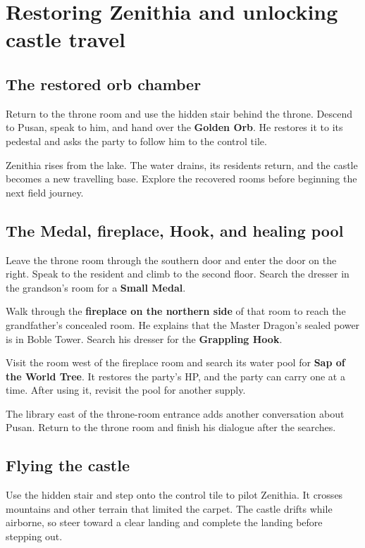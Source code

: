 \section{Restoring Zenithia and unlocking castle travel}

\subsection*{The restored orb chamber}

Return to the throne room and use the hidden stair behind the
throne. Descend to Pusan, speak to him, and hand over the
\textbf{Golden Orb}. He restores it to its pedestal and
asks the party to follow him to the control tile.

Zenithia rises from the lake. The water drains, its residents
return, and the castle becomes a new travelling base. Explore
the recovered rooms before beginning the next field journey.

\subsection*{The Medal, fireplace, Hook, and healing pool}

Leave the throne room through the southern door and enter
the door on the right. Speak to the resident and climb to
the second floor. Search the dresser in the grandson's room
for a \textbf{Small Medal}.

Walk through the \textbf{fireplace on the northern side}
of that room to reach the grandfather's concealed room.
He explains that the Master Dragon's sealed power is in
Boble Tower. Search his dresser for the \textbf{Grappling Hook}.

Visit the room west of the fireplace room and search its
water pool for \textbf{Sap of the World Tree}. It restores
the party's HP, and the party can carry one at a time.
After using it, revisit the pool for another supply.

The library east of the throne-room entrance adds another
conversation about Pusan. Return to the throne room and
finish his dialogue after the searches.

\subsection*{Flying the castle}

Use the hidden stair and step onto the control tile to
pilot Zenithia. It crosses mountains and other terrain
that limited the carpet. The castle drifts while airborne,
so steer toward a clear landing and complete the landing
before stepping out.

